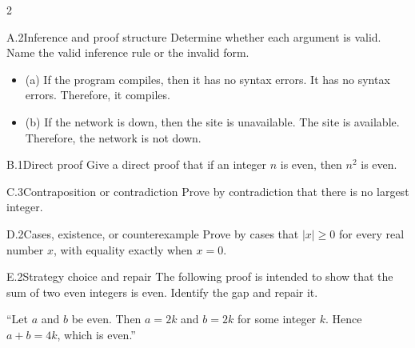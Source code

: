\documentclass[9pt]{extarticle}
\begin{document}
\begin{multicols}{2}
\begin{CoreProblem}{A.2}{Inference and proof structure}
Determine whether each argument is valid. Name the valid inference rule or the invalid form.
\begin{itemize}
  \item (a) If the program compiles, then it has no syntax errors. It has no syntax errors. Therefore, it compiles.
  \item (b) If the network is down, then the site is unavailable. The site is
        available. Therefore, the network is not down.
\end{itemize}
\end{CoreProblem}
\begin{CoreProblem}{B.1}{Direct proof}
Give a direct proof that if an integer $n$ is even, then $n^2$ is even.
\end{CoreProblem}
\begin{CoreProblem}{C.3}{Contraposition or contradiction}
Prove by contradiction that there is no largest integer.
\end{CoreProblem}
\columnbreak
\begin{CoreProblem}{D.2}{Cases, existence, or counterexample}
Prove by cases that $|x|\ge 0$ for every real number $x$, with equality exactly when $x=0$.
\end{CoreProblem}
\begin{CoreProblem}{E.2}{Strategy choice and repair}
The following proof is intended to show that the sum of two even integers is even. Identify the gap and repair it.

``Let $a$ and $b$ be even. Then $a=2k$ and $b=2k$ for some integer $k$. Hence $a+b=4k$, which is even.''
\end{CoreProblem}
\end{multicols}
\CoreWorkArea
\FormBreak
{}
\end{document}
